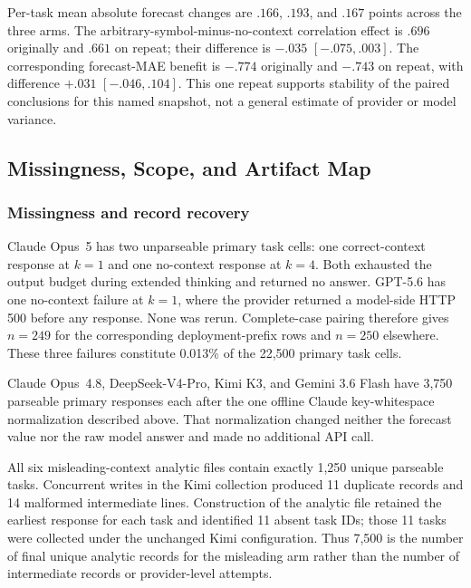 \begin{center}
\begin{minipage}{\linewidth}
\centering
{}
\label{tab:coin-city-gpt-repeat}
\scriptsize
\setlength{\tabcolsep}{2.5pt}
\resizebox{\linewidth}{!}{}
\end{minipage}
\end{center}

Per-task mean absolute forecast changes are \(.166\), \(.193\), and \(.167\)
points across the three arms. The arbitrary-symbol-minus-no-context correlation
effect is \(.696\) originally and \(.661\) on repeat; their difference is
\(-.035\) \([-.075,.003]\). The corresponding forecast-MAE benefit is
\(-.774\) originally and \(-.743\) on repeat, with difference \(+.031\)
\([-.046,.104]\). This one repeat supports stability of the paired conclusions
for this named snapshot, not a general estimate of provider or model variance.

\subsection{Missingness, Scope, and Artifact Map}
\label{app:coin-city-limitations}

\subsubsection{Missingness and record recovery}
Claude Opus~5 has two unparseable primary task cells: one correct-context response
at \(k=1\) and one no-context response at \(k=4\). Both exhausted the output
budget during extended thinking and returned no answer. GPT-5.6 has one
no-context failure at \(k=1\), where the provider returned a model-side HTTP 500
before any response. None was rerun. Complete-case pairing therefore gives
\(n=249\) for the corresponding deployment-prefix rows and \(n=250\) elsewhere.
These three failures constitute 0.013\% of the 22,500 primary task cells.

Claude Opus~4.8, DeepSeek-V4-Pro, Kimi K3, and Gemini 3.6 Flash have 3,750
parseable primary responses each after the one offline Claude key-whitespace
normalization described above. That normalization changed neither the forecast
value nor the raw model answer and made no additional API call.

All six misleading-context analytic files contain exactly 1,250 unique parseable
tasks. Concurrent writes in the Kimi collection produced 11 duplicate records and
14 malformed intermediate lines. Construction of the analytic file retained the
earliest response for each task and identified 11 absent task IDs; those 11 tasks
were collected under the unchanged Kimi configuration. Thus 7,500 is the number
of final unique analytic records for the misleading arm rather than the number of
intermediate records or provider-level attempts.

